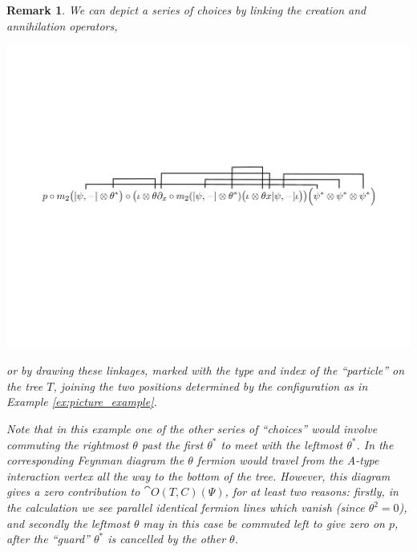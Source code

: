 \documentclass[english,letter paper,12pt,leqno]{article}
\theoremstyle{example}
\newtheorem{remark}[theorem]{Remark}
\numberwithin{equation}{section}
\begin{document}
\begin{remark}
We can depict a series of choices by linking the creation and annihilation operators,
\begin{center}
\includegraphics[scale=0.45]{dia8}
\end{center}
or by drawing these linkages, marked with the type and index of the ``particle'' on the tree $T$, joining the two positions determined by the configuration as in Example \ref{ex:picture_example}.

Note that in this example one of the other series of ``choices'' would involve commuting the rightmost $\theta$ past the first $\theta^*$ to meet with the leftmost $\theta^*$. In the corresponding Feynman diagram the $\theta$ fermion would travel from the A-type interaction vertex all the way to the bottom of the tree. However, this diagram gives a zero contribution to $\cat{O}(T,C)(\Psi)$, for at least two reasons: firstly, in the calculation we see parallel identical fermion lines which vanish (since $\theta^2 = 0$), and secondly the leftmost $\theta$ may in this case be commuted left to give zero on $p$, after the ``guard'' $\theta^*$ is cancelled by the other $\theta$.
\end{remark}
\end{document}
